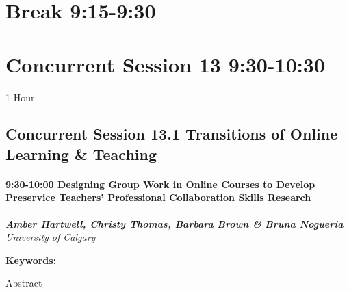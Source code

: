 \documentclass[
]{book}
\begin{document}
\hypertarget{break-915-930-2}{%
\section*{Break \textbar{} 9:15-9:30}\label{break-915-930-2}}

\hypertarget{concurrent-session-13-930-1030}{%
\section*{Concurrent Session 13 \textbar{} 9:30-10:30}\label{concurrent-session-13-930-1030}}

1 Hour

\hypertarget{concurrent-session-13.1-transitions-of-online-learning-teaching}{%
\subsection*{Concurrent Session 13.1 \textbar{} Transitions of Online Learning \& Teaching}\label{concurrent-session-13.1-transitions-of-online-learning-teaching}}

\begin{session}
\hypertarget{designing-group-work-in-online-courses-to-develop-preservice-teachers-professional-collaboration-skills-research}{%
\paragraph*{\texorpdfstring{9:30-10:00 \textbar{} \textbf{Designing
Group Work in Online Courses to Develop Preservice Teachers'
Professional Collaboration Skills} \textbar{}
Research}{9:30-10:00 \textbar{} Designing Group Work in Online Courses to Develop Preservice Teachers' Professional Collaboration Skills \textbar{} Research}}\label{designing-group-work-in-online-courses-to-develop-preservice-teachers-professional-collaboration-skills-research}}

\textbf{\emph{Amber Hartwell, Christy Thomas, Barbara Brown \& Bruna
Nogueria}} \textbar{} \emph{University of Calgary}

\textbf{Keywords:}

Abstract
\end{session}
\end{document}
